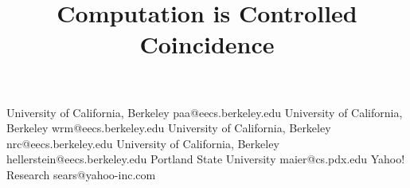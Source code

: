 \documentclass{sigplanconf}
\begin{document}
\copyrightdata{[to be supplied]}

\title{Computation is Controlled Coincidence} 
%


           {University of California, Berkeley}
           {paa@eecs.berkeley.edu}
           {University of California, Berkeley}
           {wrm@eecs.berkeley.edu}
           {University of California, Berkeley}
           {nrc@eecs.berkeley.edu}
           {University of California, Berkeley}
           {hellerstein@eecs.berkeley.edu}
           {Portland State University}
           {maier@cs.pdx.edu}
           {Yahoo! Research}
           {sears@yahoo-inc.com}



\maketitle
\end{document}
